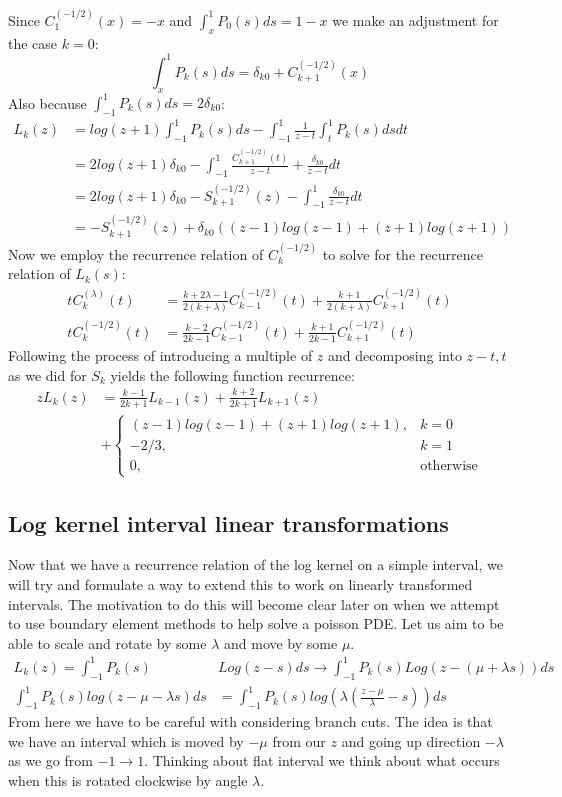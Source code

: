 \documentclass{article}
\begin{document}
Since $C_1^{(-1/2)}(x)=-x$ and $\int_x^1P_0(s)ds = 1-x$ we make an adjustment for the case $k=0$:
$$\int_x^1P_k(s)ds = \delta_{k0}+C_{k+1}^{(-1/2)}(x)$$
Also because $\int_{-1}^1P_k(s)ds=2\delta_{k0}$:
\begin{align}
    L_k(z)&=log(z+1)\int_{-1}^1P_k(s)ds-\int_{-1}^1\frac{1}{z-t}\int_t^1P_k(s)dsdt\\
    &=2log(z+1)\delta_{k0}-\int_{-1}^1\frac{C_{k+1}^{(-1/2)}(t)}{z-t}+\frac{\delta_{k0}}{z-t}dt\\
    &=2log(z+1)\delta_{k0}-S_{k+1}^{(-1/2)}(z)-\int_{-1}^1\frac{\delta_{k0}}{z-t}dt\\
    &=-S_{k+1}^{(-1/2)}(z)+\delta_{k0}((z-1)log(z-1)+(z+1)log(z+1))
\end{align}
Now we employ the recurrence relation of $C_{k}^{(-1/2)}$ to solve for the recurrence relation of $L_k(s)$:
\begin{align}
    tC_k^{(\lambda)}(t)&=\frac{k+2\lambda-1}{2(k+\lambda)}C_{k-1}^{(-1/2)}(t)+\frac{k+1}{2(k+\lambda)}C_{k+1}^{(-1/2)}(t)\\
    tC_k^{(-1/2)}(t)&=\frac{k-2}{2k-1}C_{k-1}^{(-1/2)}(t)+\frac{k+1}{2k-1}C_{k+1}^{(-1/2)}(t)
\end{align}
Following the process of introducing a multiple of $z$ and decomposing into $z-t,t$ as we did for $S_k$ yields the following function recurrence:
\begin{align}
    zL_k(z)&=\frac{k-1}{2k+1}L_{k-1}(z)+\frac{k+2}{2k+1}L_{k+1}(z)\\
    &+\begin{cases}
	(z-1)log(z-1)+(z+1)log(z+1),&k=0\\
	-2/3,&k=1\\
	0,&\text{otherwise}
    \end{cases}
\end{align}

\subsection{Log kernel interval linear transformations}
Now that we have a recurrence relation of the log kernel on a simple interval, we will try and formulate a way to extend this to work on linearly transformed intervals.
The motivation to do this will become clear later on when we attempt to use boundary element methods to help solve a poisson PDE.
Let us aim to be able to scale and rotate by some $\lambda$ and move by some $\mu$.
\begin{align}
    L_k(z)=\int_{-1}^1P_k(s)&Log(z-s)ds\rightarrow\int_{-1}^1P_k(s)Log(z-(\mu+\lambda s))ds\\
    \int_{-1}^1P_k(s)log(z-\mu-\lambda s)ds&=\int_{-1}^1P_k(s)log(\lambda(\frac{z-\mu}{\lambda}-s))ds
\end{align}
From here we have to be careful with considering branch cuts.
The idea is that we have an interval which is moved by $-\mu$ from our $z$ and going up direction $-\lambda$ as we go from $-1\rightarrow 1$.
Thinking about flat interval we think about what occurs when this is rotated clockwise by angle $\lambda$.
\end{document}

